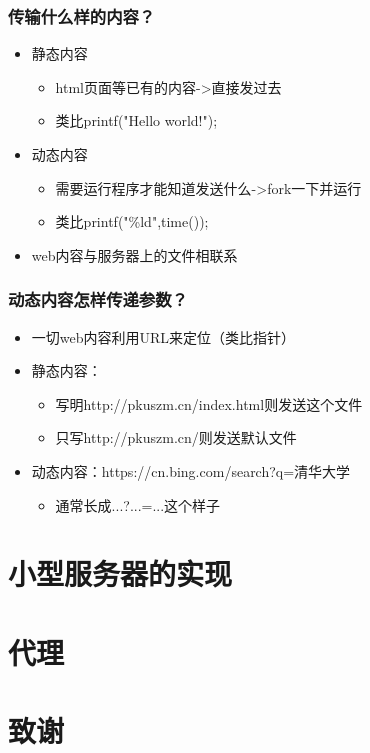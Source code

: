 \documentclass[12pt,AutoFakeBold,aspectratio=43,mathserif]{beamer}
\begin{document}
{\begin{frame}
    \end{frame}

    \begin{frame}
        \frametitle{传输什么样的内容？}
    
        \begin{itemize}
            \item 静态内容\begin{itemize}
                \item html页面等已有的内容->直接发过去
                \item 类比printf("Hello world!");
            \end{itemize}
            \item 动态内容\begin{itemize}
                \item 需要运行程序才能知道发送什么->fork一下并运行
                \item 类比printf("\%ld",time());
            \end{itemize}
            \item web内容与服务器上的文件相联系
        \end{itemize}
    
    \end{frame}

    \begin{frame}
        \frametitle{动态内容怎样传递参数？}
    
        \begin{itemize}
            \item 一切web内容利用URL来定位（类比指针）
            \item 静态内容：\begin{itemize}
                \item 写明http://pkuszm.cn/index.html则发送这个文件
                \item 只写http://pkuszm.cn/则发送默认文件
            \end{itemize}
            \item 动态内容：https://cn.bing.com/search?q=清华大学\begin{itemize}
                \item 通常长成...?...=...这个样子
            \end{itemize}
        \end{itemize}
    
    \end{frame}
    
    \section{小型服务器的实现}

    \section{代理}
    
    \section*{致谢}}
\end{document}
